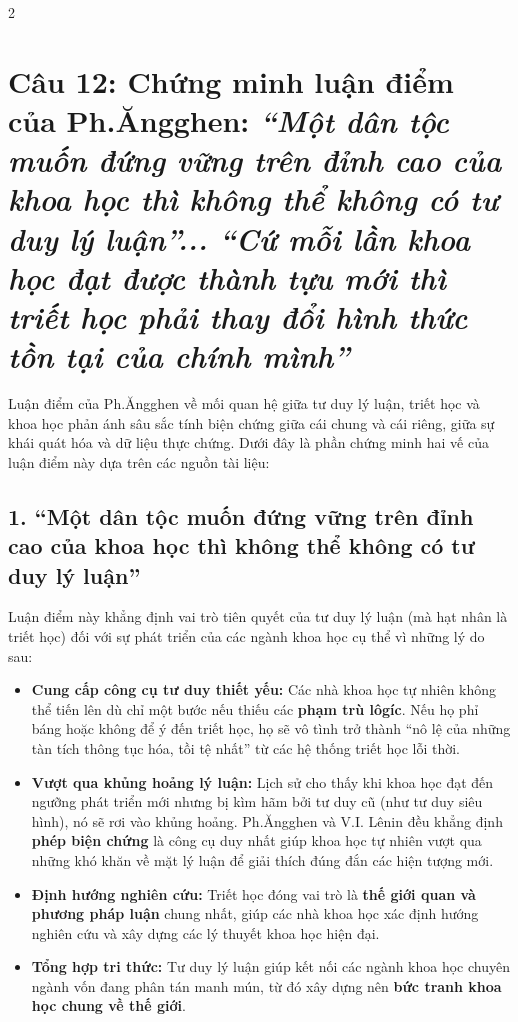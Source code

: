 \documentclass[9pt,a4paper]{extarticle}
\begin{document}
\begin{multicols*}{2}
\section*{Câu 12: Chứng minh luận điểm của Ph.Ăngghen: \textit{``Một dân tộc muốn đứng vững trên đỉnh cao của khoa học thì không thể không có tư duy lý luận''... ``Cứ mỗi lần khoa học đạt được thành tựu mới thì triết học phải thay đổi hình thức tồn tại của chính mình''}}

Luận điểm của Ph.Ăngghen về mối quan hệ giữa tư duy lý luận, triết học và khoa học phản ánh sâu sắc tính biện chứng giữa cái chung và cái riêng, giữa sự khái quát hóa và dữ liệu thực chứng. Dưới đây là phần chứng minh hai vế của luận điểm này dựa trên các nguồn tài liệu:

\subsection*{1. ``Một dân tộc muốn đứng vững trên đỉnh cao của khoa học thì không thể không có tư duy lý luận''}

Luận điểm này khẳng định vai trò tiên quyết của tư duy lý luận (mà hạt nhân là triết học) đối với sự phát triển của các ngành khoa học cụ thể vì những lý do sau:

\begin{itemize}
\item \textbf{Cung cấp công cụ tư duy thiết yếu:} Các nhà khoa học tự nhiên không thể tiến lên dù chỉ một bước nếu thiếu các \textbf{phạm trù lôgíc}. Nếu họ phỉ báng hoặc không để ý đến triết học, họ sẽ vô tình trở thành ``nô lệ của những tàn tích thông tục hóa, tồi tệ nhất'' từ các hệ thống triết học lỗi thời.
\item \textbf{Vượt qua khủng hoảng lý luận:} Lịch sử cho thấy khi khoa học đạt đến ngưỡng phát triển mới nhưng bị kìm hãm bởi tư duy cũ (như tư duy siêu hình), nó sẽ rơi vào khủng hoảng. Ph.Ăngghen và V.I. Lênin đều khẳng định \textbf{phép biện chứng} là công cụ duy nhất giúp khoa học tự nhiên vượt qua những khó khăn về mặt lý luận để giải thích đúng đắn các hiện tượng mới.
\item \textbf{Định hướng nghiên cứu:} Triết học đóng vai trò là \textbf{thế giới quan và phương pháp luận} chung nhất, giúp các nhà khoa học xác định hướng nghiên cứu và xây dựng các lý thuyết khoa học hiện đại.
\item \textbf{Tổng hợp tri thức:} Tư duy lý luận giúp kết nối các ngành khoa học chuyên ngành vốn đang phân tán manh mún, từ đó xây dựng nên \textbf{bức tranh khoa học chung về thế giới}.
\end{itemize}


\end{multicols*}
\end{document}
